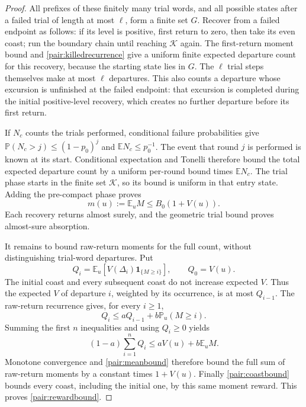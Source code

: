 \documentclass[11pt]{amsart}
\theoremstyle{definition}
\theoremstyle{remark}
\newcommand{\E}{\mathbb E}
\newcommand{\PP}{\mathbb P}
\newcommand{\one}{\mathbf 1}
\begin{document}
\begin{proof}
All prefixes of these finitely many trial words, and all possible states
after a failed trial of length at most $\ell$, form a finite set $G$.
Recover from a failed endpoint as follows: if its level is positive,
first return to zero, then take its even coast; run the boundary chain
until reaching $\mathcal K$ again.  The first-return moment bound and
\eqref{pair:killedrecurrence} give a uniform finite expected departure
count for this recovery, because the starting state lies in $G$.
The $\ell$ trial
steps themselves make at most $\ell$ departures.  This also counts a
departure whose excursion is unfinished at the failed endpoint: that
excursion is completed during the initial positive-level recovery,
which creates no further departure before its first return.

If $N_c$ counts the trials performed, conditional failure probabilities
give $\PP(N_c>j)\le(1-p_0)^j$ and $\E N_c\le p_0^{-1}$.
The event that round $j$ is performed is known at its start.  Conditional
expectation and Tonelli therefore bound the total expected departure
count by a uniform per-round bound times $\E N_c$.  The trial phase
starts in the finite set $\mathcal K$, so its bound is uniform in that
entry state.  Adding the pre-compact phase proves
\begin{equation}\label{pair:meanbound}
 m(u):=\E_u M\le B_0(1+V(u)).
\end{equation}
Each recovery returns almost surely, and the geometric trial bound proves
almost-sure absorption.

It remains to bound raw-return moments for the full count, without
distinguishing trial-word departures.  Put
\[
 Q_i=\E_u[V(\Delta_i)\one_{\{M\ge i\}}],\qquad Q_0=V(u).
\]
The initial coast and every subsequent coast do not increase expected
$V$.  Thus the expected $V$ of departure $i$, weighted by its occurrence,
is at most $Q_{i-1}$.  The raw-return recurrence gives, for every $i\ge1$,
\[
 Q_i\le aQ_{i-1}+b\PP_u(M\ge i).
\]
Summing the first $n$ inequalities and using $Q_i\ge0$ yields
\[
 (1-a)\sum_{i=1}^nQ_i\le aV(u)+b\E_u M.
\]
Monotone convergence and \eqref{pair:meanbound} therefore bound the
full sum of raw-return moments by a constant times $1+V(u)$.  Finally
\eqref{pair:coastbound} bounds every coast, including the initial one,
by this same moment reward.  This proves \eqref{pair:rewardbound}.
\end{proof}
\end{document}

